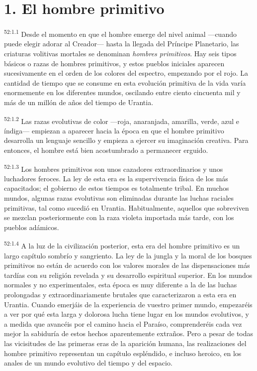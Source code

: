 \section*{1. El hombre primitivo}
\par
\textsuperscript{52:1.1} Desde el momento en que el hombre emerge del nivel animal ---cuando puede elegir adorar al Creador--- hasta la llegada del Príncipe Planetario, las criaturas volitivas mortales se denominan \textit{hombres primitivos}. Hay seis tipos básicos o razas de hombres primitivos, y estos pueblos iniciales aparecen sucesivamente en el orden de los colores del espectro, empezando por el rojo. La cantidad de tiempo que se consume en esta evolución primitiva de la vida varía enormemente en los diferentes mundos, oscilando entre ciento cincuenta mil y más de un millón de años del tiempo de Urantia.

\par
\textsuperscript{52:1.2} Las razas evolutivas de color ---roja, anaranjada, amarilla, verde, azul e índiga--- empiezan a aparecer hacia la época en que el hombre primitivo desarrolla un lenguaje sencillo y empieza a ejercer su imaginación creativa. Para entonces, el hombre está bien acostumbrado a permanecer erguido.

\par
\textsuperscript{52:1.3} Los hombres primitivos son unos cazadores extraordinarios y unos luchadores feroces. La ley de esta era es la supervivencia física de los más capacitados; el gobierno de estos tiempos es totalmente tribal. En muchos mundos, algunas razas evolutivas son eliminadas durante las luchas raciales primitivas, tal como sucedió en Urantia. Habitualmente, aquellos que sobreviven se mezclan posteriormente con la raza violeta importada más tarde, con los pueblos adámicos.

\par
\textsuperscript{52:1.4} A la luz de la civilización posterior, esta era del hombre primitivo es un largo capítulo sombrío y sangriento. La ley de la jungla y la moral de los bosques primitivos no están de acuerdo con los valores morales de las dispensaciones más tardías con su religión revelada y su desarrollo espiritual superior. En los mundos normales y no experimentales, esta época es muy diferente a la de las luchas prolongadas y extraordinariamente brutales que caracterizaron a esta era en Urantia. Cuando emerjáis de la experiencia de vuestro primer mundo, empezaréis a ver por qué esta larga y dolorosa lucha tiene lugar en los mundos evolutivos, y a medida que avancéis por el camino hacia el Paraíso, comprenderéis cada vez mejor la sabiduría de estos hechos aparentemente extraños. Pero a pesar de todas las vicisitudes de las primeras eras de la aparición humana, las realizaciones del hombre primitivo representan un capítulo espléndido, e incluso heroico, en los anales de un mundo evolutivo del tiempo y del espacio.

